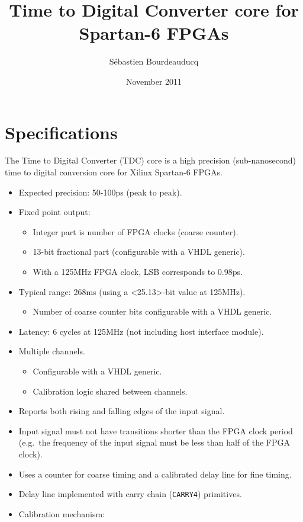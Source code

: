 \documentclass[a4paper,11pt]{article}
\title{Time to Digital Converter core for Spartan-6 FPGAs}
\author{S\'ebastien Bourdeauducq}
\date{November 2011}
\begin{document}
\setlength{\parindent}{0pt}
\setlength{\parskip}{5pt}
\maketitle{}
\section{Specifications}
The Time to Digital Converter (TDC) core is a high precision (sub-nanosecond) time to digital conversion core for Xilinx Spartan-6 FPGAs.

\begin{itemize}
\item Expected precision: 50-100ps (peak to peak).
\item Fixed point output:
\begin{itemize}
\item Integer part is number of FPGA clocks (coarse counter).
\item 13-bit fractional part (configurable with a VHDL generic).
\item With a 125MHz FPGA clock, LSB corresponds to 0.98ps.
\end{itemize}
\item Typical range: 268ms (using a <25.13>-bit value at 125MHz).
\begin{itemize}
\item Number of coarse counter bits configurable with a VHDL generic.
\end{itemize}
\item Latency: 6 cycles at 125MHz (not including host interface module).
\item Multiple channels.
\begin{itemize}
\item Configurable with a VHDL generic.
\item Calibration logic shared between channels.
\end{itemize}
\item Reports both rising and falling edges of the input signal.
\item Input signal must not have transitions shorter than the FPGA clock period (e.g.\ the frequency of the input signal must be less than half of the FPGA clock).
\item Uses a counter for coarse timing and a calibrated delay line for fine timing.
\item Delay line implemented with carry chain (\verb!CARRY4!) primitives.
\item Calibration mechanism:

\end{itemize}
\end{document}
